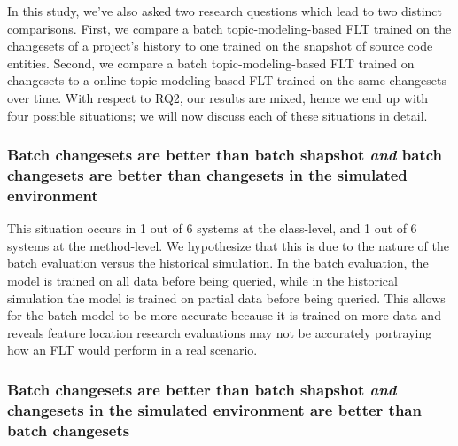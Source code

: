 In this study, we've also asked two research questions which lead to two
distinct comparisons.  First, we compare a batch topic-modeling-based FLT
trained on the changesets of a project's history to one trained on the snapshot
of source code entities.  Second, we compare a batch topic-modeling-based FLT
trained on changesets to a online topic-modeling-based FLT trained on the same
changesets over time.  With respect to RQ2, our results are mixed, hence we end
up with four possible situations; we will now discuss each of these situations
in detail.

%
%
\subsubsection{Batch changesets are better than batch shapshot
\emph{and} batch changesets are better than changesets in the simulated environment}

%

This situation occurs in
1 out of 6 systems at the class-level, and
1 out of 6 systems at the method-level.
We hypothesize that this is due to the nature of the batch evaluation versus the historical simulation.
In the batch evaluation, the model is trained on all data before being queried,
while in the historical simulation the model is trained on partial data before being queried.
This allows for the batch model to be more accurate because it is trained on more data
and reveals feature location research evaluations may not be accurately portraying
how an FLT would perform in a real scenario.

\subsubsection{Batch changesets are better than batch shapshot
\emph{and} changesets in the simulated environment are better than batch changesets}

